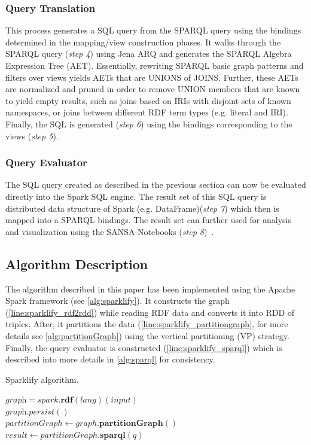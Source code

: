 \subsubsection{Query Translation}
This process generates a SQL query from the SPARQL query using the bindings determined in the mapping/view construction phases.
It walks through the SPARQL query (\textit{step 4}) using Jena ARQ and generates the SPARQL Algebra Expression Tree (AET). Essentially, rewriting SPARQL basic graph patterns and filters over views yields AETs that are UNIONS of JOINS.
Further, these AETs are normalized and pruned in order to remove UNION members that are known to yield empty results, such as joins based on IRIs with disjoint sets of known namespaces, or joins between different RDF term types (e.g. literal and IRI).
Finally, the SQL is generated (\textit{step 6}) using the bindings corresponding to the views (\textit{step 5}).

\subsubsection{Query Evaluator}
The SQL query created as described in the previous section can now be evaluated directly into the Spark SQL engine.
The result set of this SQL query is distributed data structure of Spark (e.g. DataFrame)(\textit{step 7}) which then is mapped into a SPARQL bindings.
The result set can further used for analysis and visualization using the SANSA-Notebooks (\textit{step 8})~\cite{iermilov-2017-sansa-iswc-demo}.

\subsection{Algorithm Description}
\label{subsection:algorithm}
The algorithm described in this paper has been implemented using the Apache Spark framework (see \autoref{alg:sparklify}). 
It constructs the graph (\autoref{line:sparklify_rdf2rdd}) while reading RDF data and converts it into RDD of triples.
After, it partitions the data (\autoref{line:sparklify_partitiongraph}, for more details see \autoref{alg:partitionGraph}) using the vertical partitioning (VP) strategy.
Finally, the query evaluator is constructed (\autoref{line:sparklify_sparql}) which is described into more details in \autoref{alg:sparql} for consistency.

\begin{algorithm}[t]
\caption{Sparklify algorithm.}
\label{alg:sparklify}
    $\textit{graph} = spark.\textbf{rdf}(lang)(input)$ \label{line:sparklify_rdf2rdd}\\
    $\textit{graph}.persist()$\\
    $partitionGraph \leftarrow graph.\textbf{partitionGraph}()$ \label{line:sparklify_partitiongraph}\\
    $result \leftarrow partitionGraph.\textbf{sparql}(q)$ \label{line:sparklify_sparql}\\
\end{algorithm}

